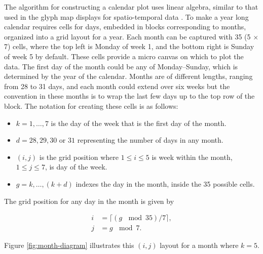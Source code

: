 \documentclass[article]{jss}
\providecommand{\tightlist}{%
  \setlength{\itemsep}{0pt}\setlength{\parskip}{0pt}}
\theoremstyle{definition}
\theoremstyle{definition}
\theoremstyle{remark}
\begin{document}
The algorithm for constructing a calendar plot uses linear algebra,
similar to that used in the glyph map displays for spatio-temporal data
\citep{Wickham2012glyph}. To make a year long calendar requires cells
for days, embedded in blocks corresponding to months, organized into a
grid layout for a year. Each month can be captured with 35 (5 \(\times\)
7) cells, where the top left is Monday of week 1, and the bottom right
is Sunday of week 5 by default. These cells provide a micro canvas on
which to plot the data. The first day of the month could be any of
Monday--Sunday, which is determined by the year of the calendar. Months
are of different lengths, ranging from 28 to 31 days, and each month
could extend over six weeks but the convention in these months is to
wrap the last few days up to the top row of the block. The notation for
creating these cells is as follows:

\begin{itemize}
\tightlist
\item
  \(k = 1, \dots , 7\) is the day of the week that is the first day of
  the month.
\item
  \(d = 28, 29, 30\) or \(31\) representing the number of days in any
  month.
\item
  \((i, j)\) is the grid position where \(1 \le i \le 5\) is week within
  the month, \(1 \le j \le 7\), is day of the week.
\item
  \(g = k, \dots,(k+d)\) indexes the day in the month, inside the 35
  possible cells.
\end{itemize}

The grid position for any day in the month is given by

\begin{equation}
  \begin{aligned}
  i &= \lceil (g\,\mod 35) / 7\rceil, \\
  j &= g\,\mod 7. \label{eq:grid}
  \end{aligned}
\end{equation}

Figure \ref{fig:month-diagram} illustrates this \((i,j)\) layout for a
month where \(k=5\).
\end{document}
